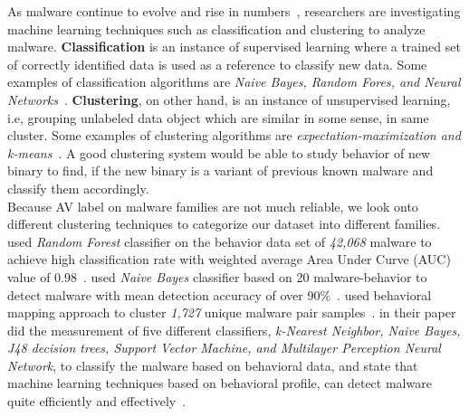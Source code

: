 As malware continue to evolve and rise in numbers~\cite[]{barecloud,avtest}, researchers are investigating machine learning techniques such as classification and clustering to analyze malware.
\textbf{Classification} is an instance of supervised learning where a trained set of correctly identified data is used as a reference to classify new data.
Some examples of classification algorithms are \emph{Naive Bayes, Random Fores, and Neural Networks}~\cite[]{classification}.
\textbf{Clustering}, on other hand, is an instance of unsupervised learning, i.e, grouping unlabeled data object which are similar in some sense, in same cluster.
Some examples of clustering algorithms are \emph{expectation-maximization and k-means}~\cite[]{clustering}.
A good clustering system would be able to study behavior of new binary to find, if the new binary is a variant of previous known malware and classify them accordingly.\\
Because AV label on malware families are not much reliable, we look onto different clustering techniques to categorize our dataset into different families.
\textbf{\citeauthor{pirscoveanu}} used \emph{Random Forest} classifier on the behavior data set of \emph{42,068} malware to achieve high classification rate with weighted average Area Under Curve (AUC) value of 0.98~\cite[]{pirscoveanu}.
\textbf{\citeauthor{mosko}} used \emph{Naive Bayes} classifier based on 20 malware-behavior to detect malware with mean detection accuracy of over 90\%~\cite[]{mosko}.
\textbf{\citeauthor{yavvari}} used behavioral mapping approach to cluster \emph{1,727} unique malware pair samples~\cite[]{yavvari}.
\textbf{\citeauthor{firdausi}} in their paper did the measurement of five different classifiers, \emph{k-Nearest Neighbor, Naive Bayes, J48 decision trees, Support Vector Machine, and Multilayer Perception Neural Network}, to classify the malware based on behavioral data, and state that machine learning techniques based on behavioral profile, can detect malware quite efficiently and effectively~\cite[]{firdausi}.
